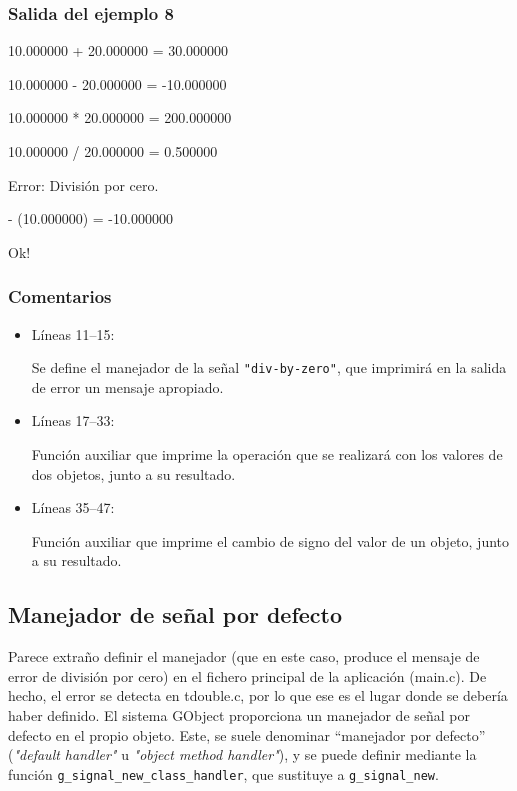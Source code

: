 \subsubsection{Salida del ejemplo 8}
10.000000 + 20.000000 = 30.000000\par
10.000000 - 20.000000 = -10.000000\par
10.000000 * 20.000000 = 200.000000\par
10.000000 / 20.000000 = 0.500000\par
\vspace{1ex}
Error: División por cero.\par
\vspace{1ex}
- (10.000000) = -10.000000\par
Ok!\par

\subsubsection{Comentarios}
\begin{itemize}
\item Líneas 11--15:\par
  Se define el manejador de la señal \texttt{"div-by-zero"}, que imprimirá en la salida
  de error un mensaje apropiado.
\item Líneas 17--33:\par
  Función auxiliar que imprime la operación que se realizará con los valores de dos
  objetos, junto a su resultado.
\item Líneas 35--47:\par
  Función auxiliar que imprime el cambio de signo del valor de un objeto, junto a su
  resultado.
\end{itemize}

\subsection{Manejador de señal por defecto}
Parece extraño definir el manejador (que en este caso, produce el mensaje de error de
división por cero) en el fichero principal de la aplicación (\textsf{main.c}). De hecho,
el error se detecta en \textsf{tdouble.c}, por lo que ese es el lugar donde se debería
haber definido. El sistema \textsf{GObject} proporciona un manejador de señal por
defecto en el propio objeto. Este, se suele denominar ``manejador por defecto''
(\emph{"default handler"} u \emph{"object method handler"}), y se puede definir mediante
la función \texttt{g\_signal\_new\_class\_handler}, que sustituye a \texttt{g\_signal\_new}.

